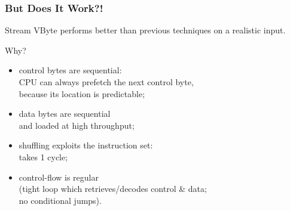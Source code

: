 \begin{frame}
\frametitle{But Does It Work?!}

\vspace*{-1em}

Stream VByte performs better than previous techniques on a realistic input.


Why?

\begin{itemize}
\item control bytes are sequential:\\
\hspace*{1em} CPU can always prefetch the next control byte, \\
\hspace*{1em} because
its location is predictable;
\item data bytes are sequential \\
\hspace*{1em}and loaded at high throughput;
\item shuffling exploits the instruction set: \\
\hspace*{1em}takes 1 cycle;
\item control-flow is regular \\
\hspace*{1em}(tight loop which retrieves/decodes control
\& data;\\
\hspace*{1em}no conditional jumps).
\end{itemize}
\end{frame}




